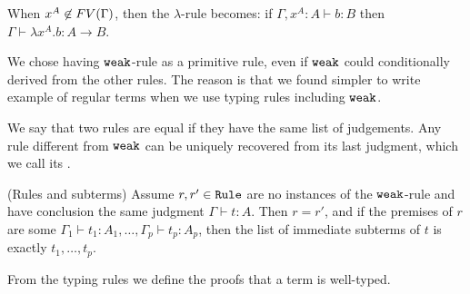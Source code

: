 When $x^A \not \in {{\relax FV}}(\Gamma)$, then the $\lambda$-rule becomes:
if $\Gamma, x^A:A \vdash b: B$
then $ \Gamma  \vdash \lambda x^A.b :A \rightarrow B$.

We chose having ${\tt weak}$-rule as a primitive rule, even if ${\tt weak}$ could 
conditionally derived from the other rules. The reason is that we found simpler
to write example of regular terms when we use typing rules including ${\tt weak}$.
 


We say that two rules are equal if they have the same list of judgements. 
Any rule different from ${\tt weak}$ can be uniquely recovered from its last
judgment, which we call its .

\begin{proposition}(Rules and subterms)
\label{proposition-rules-subterms}
Assume $r, r' \in {\tt Rule}$ are no instances of the ${\tt weak}$-rule 
and have conclusion the same judgment $\Gamma \vdash t:A$.
Then $r = r'$, and if the premises of $r$ are some 
$\Gamma_1 \vdash t_1:A_1, \ldots, \Gamma_p \vdash t_p:A_p$,
then the list of immediate subterms of $t$ is exactly $t_1, \ldots, t_p$.
\end{proposition}

From the typing rules we define the proofs that a term is well-typed. 


